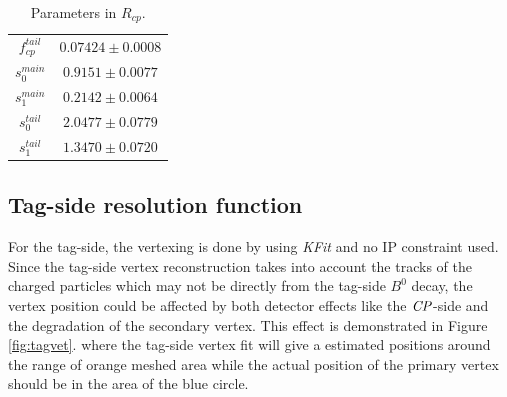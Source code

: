 \begin{table}[H]
	\begin{minipage}[b]{1.0\linewidth}
		\centering
		\caption{Parameters in $R_{cp}$.}
		\label{tab:Rcp}
		\begin{tabular}{|c|c|}
			\hline
			$f_{cp}^{tail}$ & $0.07424 \pm 0.0008$\\
			$s_0^{main}$&  $0.9151 \pm 0.0077$ \\
			$s_1^{main}$ & $0.2142\pm 0.0064$\\
			$s_0^{tail}$ &  $2.0477\pm 0.0779$\\
			$s_1^{tail}$  & $1.3470\pm 0.0720$ \\
			\hline
		\end{tabular}
	\end{minipage}
\end{table}

\subsection{Tag-side resolution function}

For the tag-side, the vertexing is done by using \textit{KFit} and no IP constraint used. Since the tag-side vertex reconstruction takes into account the tracks of the charged particles which may not be directly from the tag-side $B^0$ decay, the vertex position could be affected by both detector effects like the $\it{CP}$-side and the degradation of the secondary vertex. This effect is demonstrated in Figure \ref{fig:tagvet}. where the tag-side vertex fit will give a estimated positions around the range of orange meshed area while the actual position of the primary vertex should be in the area of the blue circle.

